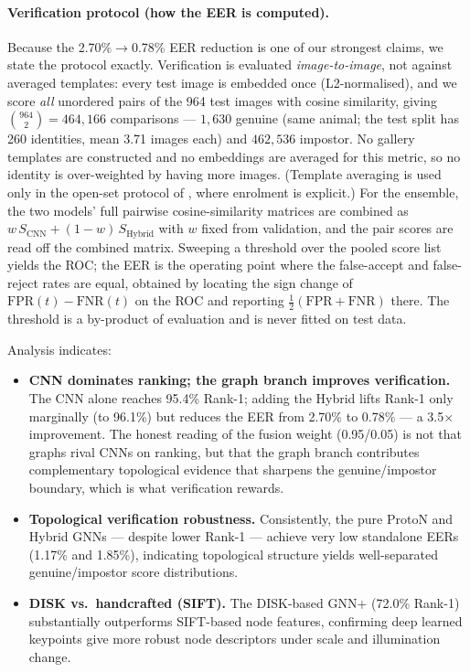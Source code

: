 \documentclass[11pt]{article}
\begin{document}
\paragraph{Verification protocol (how the EER is computed).} Because the 2.70\%$\to$0.78\%
EER reduction is one of our strongest claims, we state the protocol exactly. Verification is
evaluated \emph{image-to-image}, not against averaged templates: every test image is embedded
once (L2-normalised), and we score \emph{all} unordered pairs of the 964 test images with
cosine similarity, giving $\binom{964}{2}=464{,}166$ comparisons --- $1{,}630$ genuine
(same animal; the test split has 260 identities, mean 3.71 images each) and $462{,}536$
impostor. No gallery templates are constructed and no embeddings are averaged for this
metric, so no identity is over-weighted by having more images. (Template averaging is used
only in the open-set protocol of , where enrolment is explicit.) For the
ensemble, the two models' full pairwise cosine-similarity matrices are combined as
$w\,S_{\text{CNN}}+(1-w)\,S_{\text{Hybrid}}$ with $w$ fixed from validation, and the pair
scores are read off the combined matrix. Sweeping a threshold over the pooled score list
yields the ROC; the EER is the operating point where the false-accept and false-reject rates
are equal, obtained by locating the sign change of $\mathrm{FPR}(t)-\mathrm{FNR}(t)$ on the
ROC and reporting $\tfrac{1}{2}(\mathrm{FPR}+\mathrm{FNR})$ there. The threshold is a
by-product of evaluation and is never fitted on test data.

\medskip\noindent Analysis indicates:
\begin{itemize}\itemsep2pt
  \item \textbf{CNN dominates ranking; the graph branch improves verification.} The CNN
  alone reaches 95.4\% Rank-1; adding the Hybrid lifts Rank-1 only marginally (to 96.1\%)
  but reduces the EER from 2.70\% to 0.78\% --- a 3.5$\times$ improvement. The honest reading
  of the fusion weight (0.95/0.05) is not that graphs rival CNNs on ranking, but that the
  graph branch contributes complementary topological evidence that sharpens the
  genuine/impostor boundary, which is what verification rewards.
  \item \textbf{Topological verification robustness.} Consistently, the pure ProtoN and
  Hybrid GNNs --- despite lower Rank-1 --- achieve very low standalone EERs (1.17\% and
  1.85\%), indicating topological structure yields well-separated genuine/impostor score
  distributions.
  \item \textbf{DISK vs.\ handcrafted (SIFT).} The DISK-based GNN+ (72.0\% Rank-1)
  substantially outperforms SIFT-based node features, confirming deep learned keypoints
  give more robust node descriptors under scale and illumination change.
\end{itemize}
\end{document}
